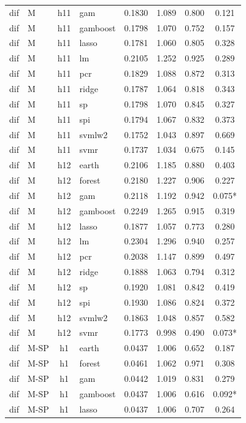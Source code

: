 \begin{ThreePartTable}
\begin{longtable}[t]{llclcccc}
dif & M & h11 & gam & 0.1830 & 1.089 & 0.800 & 0.121\\
dif & M & h11 & gamboost & 0.1798 & 1.070 & 0.752 & 0.157\\
dif & M & h11 & lasso & 0.1781 & 1.060 & 0.805 & 0.328\\
dif & M & h11 & lm & 0.2105 & 1.252 & 0.925 & 0.289\\
dif & M & h11 & pcr & 0.1829 & 1.088 & 0.872 & 0.313\\
dif & M & h11 & ridge & 0.1787 & 1.064 & 0.818 & 0.343\\
dif & M & h11 & sp & 0.1798 & 1.070 & 0.845 & 0.327\\
dif & M & h11 & spi & 0.1794 & 1.067 & 0.832 & 0.373\\
dif & M & h11 & svmlw2 & 0.1752 & 1.043 & 0.897 & 0.669\\
dif & M & h11 & svmr & 0.1737 & 1.034 & 0.675 & 0.145\\
\addlinespace
dif & M & h12 & earth & 0.2106 & 1.185 & 0.880 & 0.403\\
dif & M & h12 & forest & 0.2180 & 1.227 & 0.906 & 0.227\\
dif & M & h12 & gam & 0.2118 & 1.192 & 0.942 & 0.075*\\
dif & M & h12 & gamboost & 0.2249 & 1.265 & 0.915 & 0.319\\
dif & M & h12 & lasso & 0.1877 & 1.057 & 0.773 & 0.280\\
dif & M & h12 & lm & 0.2304 & 1.296 & 0.940 & 0.257\\
dif & M & h12 & pcr & 0.2038 & 1.147 & 0.899 & 0.497\\
dif & M & h12 & ridge & 0.1888 & 1.063 & 0.794 & 0.312\\
dif & M & h12 & sp & 0.1920 & 1.081 & 0.842 & 0.419\\
dif & M & h12 & spi & 0.1930 & 1.086 & 0.824 & 0.372\\
dif & M & h12 & svmlw2 & 0.1863 & 1.048 & 0.857 & 0.582\\
dif & M & h12 & svmr & 0.1773 & 0.998 & 0.490 & 0.073*\\
\addlinespace
dif & M-SP & h1 & earth & 0.0437 & 1.006 & 0.652 & 0.187\\
dif & M-SP & h1 & forest & 0.0461 & 1.062 & 0.971 & 0.308\\
dif & M-SP & h1 & gam & 0.0442 & 1.019 & 0.831 & 0.279\\
dif & M-SP & h1 & gamboost & 0.0437 & 1.006 & 0.616 & 0.092*\\
dif & M-SP & h1 & lasso & 0.0437 & 1.006 & 0.707 & 0.264\\

\end{longtable}
\end{ThreePartTable}
